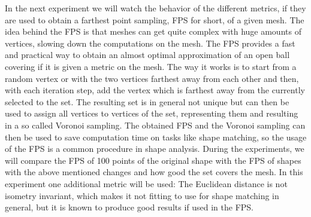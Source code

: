 In the next experiment we will watch the behavior of the different metrics, if they are used to obtain a farthest point sampling, FPS for short, of a given mesh.
The idea behind the FPS is that meshes can get quite complex with huge amounts of vertices, slowing down the computations on the mesh.
The FPS provides a fast and practical way to obtain an almost optimal approximation of an open ball covering if it is given a metric on the mesh.
The way it works is to start from a random vertex or with the two vertices farthest away from each other and then, with each iteration step, add the vertex which is farthest away from the currently selected to the set.
The resulting set is in general not unique but can then be used to assign all vertices to vertices of the set, representing them and resulting in a so called Voronoi sampling.
The obtained FPS and the Voronoi sampling can then be used to save computation time on tasks like shape matching, so the usage of the FPS is a common procedure in shape analysis.
During the experiments, we will compare the FPS of 100 points  of the original shape with the FPS of shapes with the above mentioned changes and how good the set covers the mesh.
In this experiment one additional metric will be used:
The Euclidean distance is not isometry invariant, which makes it not fitting to use for shape matching in general, but it is known to produce good results if used in the FPS.
